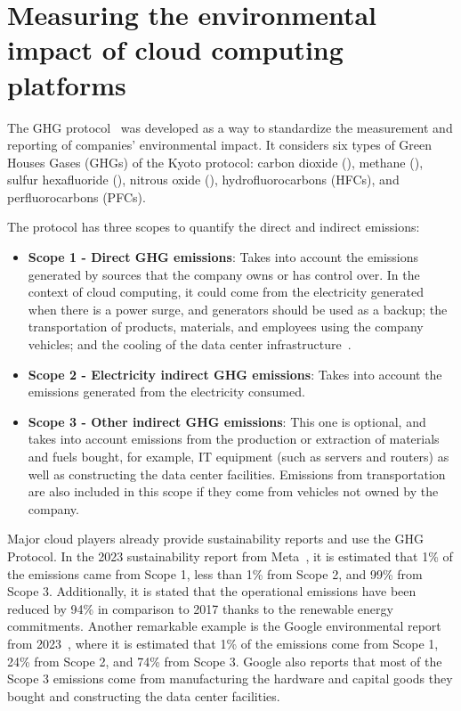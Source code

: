 \section{Measuring the environmental impact of cloud computing platforms}

\label{sec:measuring_environmental_impact}


The GHG protocol~\cite{ghgprotocol2004} was developed as a way to standardize the measurement and reporting of companies' environmental impact. It considers six types of Green Houses Gases (GHGs) of the Kyoto protocol: carbon dioxide (), methane (), sulfur hexafluoride (), nitrous oxide (), hydrofluorocarbons (HFCs), and perfluorocarbons (PFCs).


The protocol has three scopes to quantify the direct and indirect emissions:

\begin{itemize}
\item \textbf{Scope 1 - Direct GHG emissions}: Takes into account the emissions generated by sources that the company owns or has control over. In the context of cloud computing, it could come from the electricity generated when there is a power surge, and generators should be used as a backup; the transportation of products, materials, and employees using the company vehicles; and the cooling of the data center infrastructure~\cite{gupta2021_chasingcarbon}.
\item \textbf{Scope 2 - Electricity indirect GHG emissions}: Takes into account the emissions generated from the electricity consumed.
\item \textbf{Scope 3 - Other indirect GHG emissions}: This one is optional, and takes into account emissions from the production or extraction of materials and fuels bought, for example, IT equipment (such as servers and routers) as well as constructing the data center facilities. Emissions from transportation are also included in this scope if they come from vehicles not owned by the company.
\end{itemize}  

Major cloud players already provide sustainability reports and use the GHG Protocol. In the 2023 sustainability report from Meta~\cite{meta_sustainability_report_2023}, it is estimated that 1\% of the emissions came from Scope 1, less than 1\% from Scope 2, and 99\% from Scope 3. Additionally, it is stated that the operational emissions have been reduced by 94\% in comparison to 2017 thanks to the renewable energy commitments. Another remarkable example is the Google environmental report from 2023~\cite{google_sustainability_report_2023}, where it is estimated that 1\% of the emissions come from Scope 1, 24\% from Scope 2, and 74\% from Scope 3. Google also reports that most of the Scope 3 emissions come from manufacturing the hardware and capital goods they bought and constructing the data center facilities.

